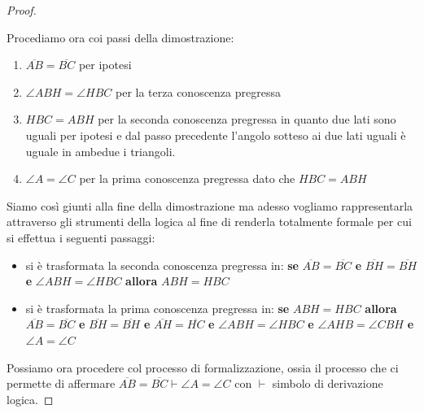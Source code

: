 \documentclass[a4paper]{book}
\begin{document}
\begin{proof}
\begin{enumerate}
\end{enumerate}
Procediamo ora coi passi della dimostrazione:
\begin{enumerate}
\item $\overline{AB}=\overline{BC}$ per ipotesi
\item $\angle ABH = \angle HBC$ per la terza conoscenza pregressa
\item $HBC = ABH$ per la seconda conoscenza pregressa in quanto due lati sono uguali per ipotesi e dal passo precedente
      l'angolo sotteso ai due lati uguali è uguale in ambedue i triangoli.
\item $\angle A= \angle C$ per la prima conoscenza pregressa dato che $HBC = ABH$
\end{enumerate}
Siamo così giunti alla fine della dimostrazione ma adesso vogliamo rappresentarla attraverso gli strumenti della logica al fine di renderla
totalmente formale per cui si effettua i seguenti passaggi:
\begin{itemize}
\item si è trasformata la seconda conoscenza pregressa in:\newline
  \textbf{se} $\overline{AB}=\overline{BC}$ \textbf{e} $\overline{BH}=\overline{BH}$ \textbf{e} $\angle ABH = \angle HBC$
  \textbf{allora} $ABH = HBC$
\item si è trasformata la prima conoscenza pregressa in:\newline
  \textbf{se} $ABH = HBC$ \textbf{allora} $\overline{AB}=\overline{BC}$ \textbf{e} $\overline{BH}=\overline{BH}$
  \textbf{e} $\overline{AH}=\overline{HC}$ \textbf{e} $\angle ABH = \angle HBC$ \textbf{e} $\angle AHB = \angle CBH$ \textbf{e} $\angle A=\angle C$
\end{itemize}
Possiamo ora procedere col processo di formalizzazione, ossia il processo che ci permette di affermare
$\overline{AB} = \overline{BC} \vdash \angle A = \angle C$ con $\vdash$ simbolo di derivazione logica.


\end{proof}
\end{document}
